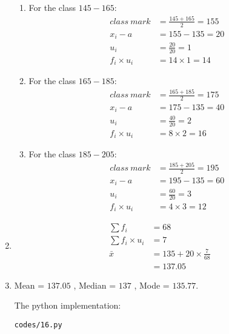 \begin{enumerate}
\begin{enumerate}
\item For the class $145-165$:
\begin{align*}
class\ mark &= \frac{145+165}{2} = 155\\
x_i - a &= 155-135 = 20\\
u_i &= \frac{20}{20} = 1\\
f_i \times u_i &= 14 \times 1 = 14 
\end{align*}

\item For the class $165-185$:
\begin{align*}
class\ mark &= \frac{165+185}{2} = 175\\
x_i - a &= 175-135 = 40\\
u_i &= \frac{40}{20} = 2 \\
f_i \times u_i &= 8 \times 2 = 16 
\end{align*}

\item For the class $185-205$:
\begin{align*}
class\ mark &= \frac{185+205}{2} = 195\\
x_i - a &= 195-135 = 60\\
u_i &= \frac{60}{20} = 3\\ 
f_i \times u_i &= 4 \times 3 = 12 
\end{align*}


\end{enumerate}

\item 
\begin{align*}
\sum f_i &= 68\\
\sum f_i \times u_i &= 7\\
\bar{x} &= 135 + 20 \times \frac{7}{68}\\
&= 137.05
\end{align*}

\item Mean = $137.05$ , Median = $137$ , Mode = $135.77$.

The python implementation:
\begin{lstlisting}
codes/16.py
\end{lstlisting}


\end{enumerate}

